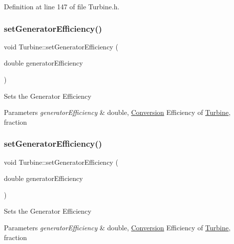 Definition at line 147 of file Turbine.\+h.

\mbox{\label{class_turbine_a51e9c5050a5be51b86dc23e690bd3f40}} 
\subsubsection{\texorpdfstring{set\+Generator\+Efficiency()}{setGeneratorEfficiency()}\hspace{0.1cm}{\footnotesize\ttfamily [1/3]}}
{\footnotesize\ttfamily void Turbine\+::set\+Generator\+Efficiency (\begin{DoxyParamCaption}\item[{double}]{generator\+Efficiency }\end{DoxyParamCaption})}

Sets the Generator Efficiency


\begin{DoxyParams}{Parameters}
{\em generator\+Efficiency} & double, \hyperlink{class_conversion}{Conversion} Efficiency of \hyperlink{class_turbine}{Turbine}, fraction \\
\hline
\end{DoxyParams}
\mbox{\label{class_turbine_a51e9c5050a5be51b86dc23e690bd3f40}} 
\subsubsection{\texorpdfstring{set\+Generator\+Efficiency()}{setGeneratorEfficiency()}\hspace{0.1cm}{\footnotesize\ttfamily [2/3]}}
{\footnotesize\ttfamily void Turbine\+::set\+Generator\+Efficiency (\begin{DoxyParamCaption}\item[{double}]{generator\+Efficiency }\end{DoxyParamCaption})}

Sets the Generator Efficiency


\begin{DoxyParams}{Parameters}
{\em generator\+Efficiency} & double, \hyperlink{class_conversion}{Conversion} Efficiency of \hyperlink{class_turbine}{Turbine}, fraction \\
\hline
\end{DoxyParams}


